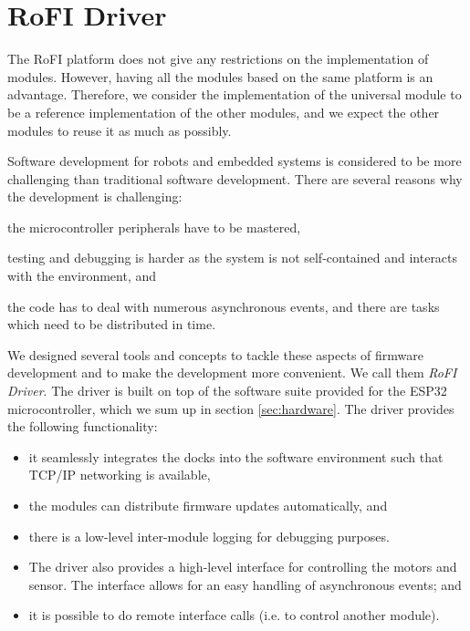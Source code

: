 \chapter{RoFI Driver}\label{chap:software}

The RoFI platform does not give any restrictions on the implementation of
modules. However, having all the modules based on the same platform is an
advantage. Therefore, we consider the implementation of the universal module to
be a reference implementation of the other modules, and we expect the other
modules to reuse it as much as possibly.

Software development for robots and embedded systems is considered to be more
challenging than traditional software development. There are several reasons why
the development is challenging:
\begin{enumerate*}
    \item the microcontroller peripherals have to be mastered,
    \item testing and debugging is harder as the system is not self-contained
    and interacts with the environment, and
    \item the code has to deal with numerous asynchronous events, and there are
    tasks which need to be distributed in time.
\end{enumerate*}

We designed several tools and concepts to tackle these aspects of firmware
development and to make the development more convenient. We call them \emph{RoFI
Driver}. The driver is built on top of the software suite provided for the ESP32
microcontroller, which we sum up in section \ref{sec:hardware}. The driver
provides the following functionality:
\begin{itemize}
    \item it seamlessly integrates the docks into the software environment such
    that TCP/IP networking is available,
    \item the modules can distribute firmware updates automatically, and
    \item there is a low-level inter-module logging for debugging purposes.
    \item The driver also provides a high-level interface for controlling the
    motors and sensor. The interface allows for an easy handling of asynchronous
    events; and
    \item it is possible to do remote interface calls (i.e. to control another
    module).
\end{itemize}

